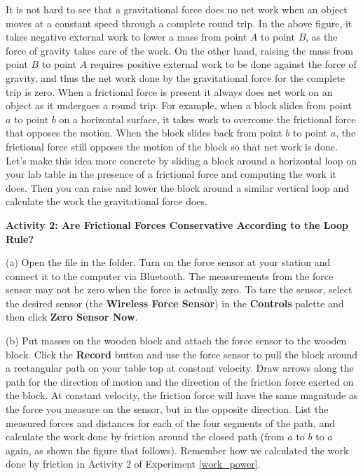 It is not hard to see that a gravitational force does no net work when an object
moves at a constant speed through a complete round trip. In the above figure,
it takes negative external work to lower a mass from point $A$ to point $B$, as
the force of gravity takes care of the work. On the other hand, raising the
mass from point $B$ to point $A$ requires positive external work to be done against the force of gravity, and thus the net work done by the gravitational force
for the complete trip is zero. When a frictional force is present it always
does net work on an object as it undergoes a round trip. For example, when a
block slides from point $a$ to point $b$ on a horizontal surface, it takes work
to overcome the frictional force that opposes the motion. When the block slides
back from point $b$ to point $a$, the frictional force still opposes the motion
of the block so that net work is done. Let's make this idea more concrete by
sliding a block around a horizontal loop on your lab table in the presence of
a frictional force and computing the work it does. Then you can raise and lower
the block around a similar vertical loop and calculate the work the gravitational force does.

\bigskip
\textbf{Activity 2: Are Frictional Forces Conservative According to the Loop
Rule?} 

(a) Open the  file in the \filename{\coursefolder} folder. Turn on the force sensor at your station and connect it to the computer via Bluetooth. The measurements from the force sensor may not be zero when the force is actually zero. To tare the sensor, select the desired sensor (the \textbf{Wireless Force Sensor}) in the \textbf{Controls} palette and then click \textbf{Zero Sensor Now}. 

(b) Put masses on the wooden block and attach the force sensor to the wooden block. Click the \textbf{Record} button and use the force sensor to pull the block around a rectangular path on your table top at constant velocity. Draw arrows along the path for the direction of motion and the direction of the friction force exerted on the block. At constant velocity, the friction force will have the same magnitude as the force you measure on the sensor, but in the opposite direction. List the measured forces and distances for each of the four segments of the path, and calculate the work done by friction around the closed path (from $a$ to $b$ to $a$ again, as shown the figure that follows). Remember how we calculated the work done by friction in Activity 2 of Experiment \ref{work_power}.

